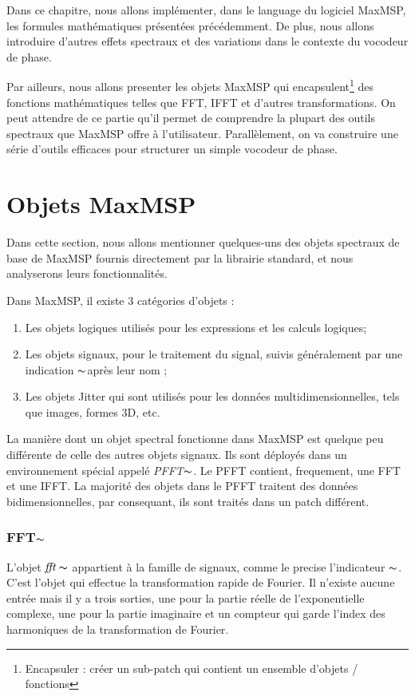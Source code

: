 
\label{ch:Design}

Dans ce chapitre, nous allons implémenter, dans le language du logiciel MaxMSP, les formules mathématiques présentées précédemment. De plus, nous allons introduire d'autres effets spectraux et des variations dans le contexte du vocodeur de phase.

Par ailleurs, nous allons presenter les objets MaxMSP qui encapsulent\footnote{Encapsuler : créer un sub-patch qui contient un ensemble d'objets / fonctions } des fonctions mathématiques telles que FFT, IFFT et d’autres transformations. On peut attendre de ce partie qu'il permet de comprendre la plupart des outils spectraux que MaxMSP offre à l’utilisateur. Parallèlement, on va construire une série d’outils efficaces pour structurer un simple vocodeur de phase.

\section{Objets MaxMSP}

Dans cette section, nous allons mentionner quelques-uns des objets spectraux de base de MaxMSP fournis directement par la librairie standard, et nous analyserons leurs fonctionnalités.

Dans MaxMSP, il existe 3 catégories d’objets :
\begin{enumerate}
    \item
    Les objets logiques utilisés pour les expressions et les calculs logiques; 
    \item
    Les objets signaux, pour le traitement du signal, suivis généralement par une indication \guillemotleft$ \thicksim $\guillemotright après leur nom ; 
    \item
    Les objets Jitter qui sont utilisés pour les données multidimensionnelles, tels que images, formes 3D, etc.
\end{enumerate}

La manière dont un objet spectral fonctionne dans MaxMSP est quelque peu différente de celle des autres objets signaux. Ils sont déployés dans un environnement spécial appelé \textit{PFFT}$\thicksim $. Le PFFT contient, frequement, une FFT et une IFFT. La majorité des objets dans le PFFT traitent des données bidimensionnelles, par consequant, ils sont traités dans un patch différent.

\subsubsection{FFT$\thicksim$}
    L'objet $ \textit{fft}\thicksim $ appartient à la famille de signaux, comme le precise l'indicateur $ \thicksim $. C'est l'objet qui effectue la transformation rapide de Fourier. Il n'existe aucune entrée mais il y a trois sorties, une pour la partie réelle de l'exponentielle complexe, une pour la partie imaginaire et un compteur qui garde l’index des harmoniques de la transformation de Fourier.

